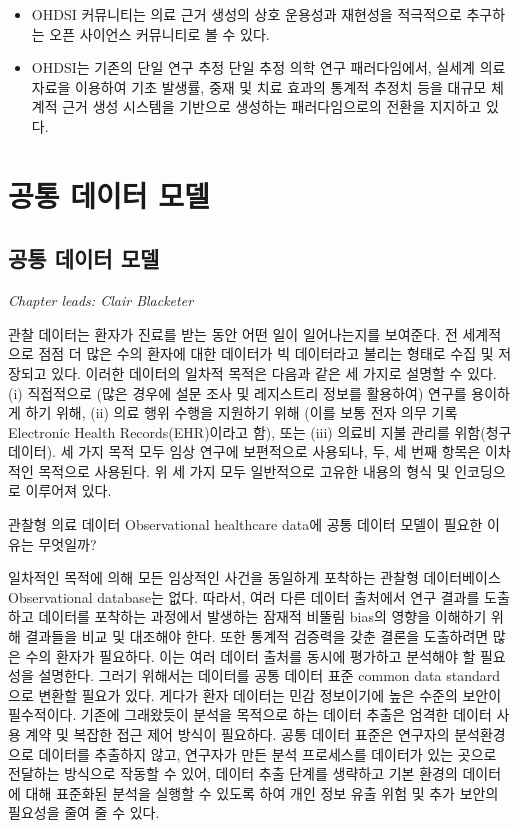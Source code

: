 \documentclass[10.5pt]{book}
\theoremstyle{definition}
\theoremstyle{definition}
\theoremstyle{definition}
\theoremstyle{remark}
\let\BeginKnitrBlock\begin \let\EndKnitrBlock\end
\begin{document}
\BeginKnitrBlock{rmdsummary}
\begin{itemize}
\item
  OHDSI 커뮤니티는 의료 근거 생성의 상호 운용성과 재현성을 적극적으로
  추구하는 오픈 사이언스 커뮤니티로 볼 수 있다.
\item
  OHDSI는 기존의 단일 연구 추정 단일 추정 의학 연구 패러다임에서, 실세계
  의료 자료을 이용하여 기초 발생률, 중재 및 치료 효과의 통계적 추정치
  등을 대규모 체계적 근거 생성 시스템을 기반으로 생성하는 패러다임으로의
  전환을 지지하고 있다.
\end{itemize}
\EndKnitrBlock{rmdsummary}

\part{공통 데이터 모델}\label{part---}

\chapter{공통 데이터 모델}\label{CommonDataModel}

\emph{Chapter leads: Clair Blacketer}

관찰 데이터는 환자가 진료를 받는 동안 어떤 일이 일어나는지를 보여준다.
전 세계적으로 점점 더 많은 수의 환자에 대한 데이터가 빅 데이터라고
불리는 형태로 수집 및 저장되고 있다. 이러한 데이터의 일차적 목적은
다음과 같은 세 가지로 설명할 수 있다. (i) 직접적으로 (많은 경우에 설문
조사 및 레지스트리 정보를 활용하여) 연구를 용이하게 하기 위해, (ii) 의료
행위 수행을 지원하기 위해 (이를 보통 전자 의무 기록 Electronic Health
Records(EHR)이라고 함), 또는 (iii) 의료비 지불 관리를 위함(청구 데이터).
세 가지 목적 모두 임상 연구에 보편적으로 사용되나, 두, 세 번째 항목은
이차적인 목적으로 사용된다. 위 세 가지 모두 일반적으로 고유한 내용의
형식 및 인코딩으로 이루어져 있다. 

관찰형 의료 데이터 Observational healthcare data에 공통 데이터 모델이
필요한 이유는 무엇일까?

일차적인 목적에 의해 모든 임상적인 사건을 동일하게 포착하는 관찰형
데이터베이스 Observational database는 없다. 따라서, 여러 다른 데이터
출처에서 연구 결과를 도출하고 데이터를 포착하는 과정에서 발생하는 잠재적
비뚤림 bias의 영향을 이해하기 위해 결과들을 비교 및 대조해야 한다. 또한
통계적 검증력을 갖춘 결론을 도출하려면 많은 수의 환자가 필요하다. 이는
여러 데이터 출처를 동시에 평가하고 분석해야 할 필요성을 설명한다. 그러기
위해서는 데이터를 공통 데이터 표준 common data standard으로 변환할
필요가 있다. 게다가 환자 데이터는 민감 정보이기에 높은 수준의 보안이
필수적이다. 기존에 그래왔듯이 분석을 목적으로 하는 데이터 추출은 엄격한
데이터 사용 계약 및 복잡한 접근 제어 방식이 필요하다. 공통 데이터 표준은
연구자의 분석환경으로 데이터를 추출하지 않고, 연구자가 만든 분석
프로세스를 데이터가 있는 곳으로 전달하는 방식으로 작동할 수 있어, 데이터
추출 단계를 생략하고 기본 환경의 데이터에 대해 표준화된 분석을 실행할 수
있도록 하여 개인 정보 유출 위험 및 추가 보안의 필요성을 줄여 줄 수 있다.
\end{document}
